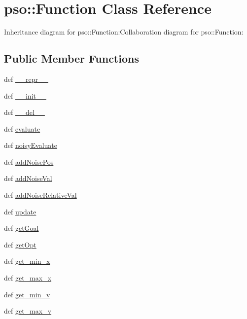 \hypertarget{classpso_1_1Function}{
\section{pso::Function Class Reference}
\label{classpso_1_1Function}
}
Inheritance diagram for pso::Function:Collaboration diagram for pso::Function:\subsection*{Public Member Functions}
\begin{CompactItemize}
\item 
def \hyperlink{classpso_1_1Function_959f07a6de4f333461fdb0261e6c25ae}{\_\-\_\-repr\_\-\_\-}
\item 
def \hyperlink{classpso_1_1Function_6874097c6476dc85af64b40e76a807e9}{\_\-\_\-init\_\-\_\-}
\item 
def \hyperlink{classpso_1_1Function_c80bd40fcf4a956e5732ed099bccc598}{\_\-\_\-del\_\-\_\-}
\item 
def \hyperlink{classpso_1_1Function_7c958ea6d942a89ae219b872b4d73541}{evaluate}
\item 
def \hyperlink{classpso_1_1Function_519ce59a07719b4a0bea88a642e1c685}{noisyEvaluate}
\item 
def \hyperlink{classpso_1_1Function_b513ffe2a27e5f3ff68f40bd20680825}{addNoisePos}
\item 
def \hyperlink{classpso_1_1Function_fe29a56e75f3a076e00fdecbb8d4197d}{addNoiseVal}
\item 
def \hyperlink{classpso_1_1Function_839d1e649623a32eef82be4e64f481ad}{addNoiseRelativeVal}
\item 
def \hyperlink{classpso_1_1Function_95ef0ee896d9855495cb2518c368fecf}{update}
\item 
def \hyperlink{classpso_1_1Function_f9adcf9d0da73d89e6f411f0f0f27d2c}{getGoal}
\item 
def \hyperlink{classpso_1_1Function_ec3f76a1844cf52fd7a4f49856e6a40e}{getOpt}
\item 
def \hyperlink{classpso_1_1Function_b502339a9dc9eaed402856156b8f0932}{get\_\-min\_\-x}
\item 
def \hyperlink{classpso_1_1Function_fb6726a96d5ab4dcb6ac845a95172585}{get\_\-max\_\-x}
\item 
def \hyperlink{classpso_1_1Function_6d2c5e6dca8a99d077e0a1679c7e3a14}{get\_\-min\_\-v}
\item 
def \hyperlink{classpso_1_1Function_0de152ecef2a4263ec72fa949540efed}{get\_\-max\_\-v}

\end{CompactItemize}
